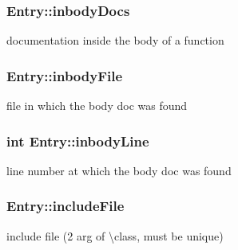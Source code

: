 \hypertarget{class_entry_a51e209dbd21d11b0c63d246efa6182f2}{}
\subsubsection[{inbody\+Docs}]{ Entry\+::inbody\+Docs}\label{class_entry_a51e209dbd21d11b0c63d246efa6182f2}


documentation inside the body of a function 

\hypertarget{class_entry_aee8cba460792393b5051230c78fbb204}{}
\subsubsection[{inbody\+File}]{ Entry\+::inbody\+File}\label{class_entry_aee8cba460792393b5051230c78fbb204}


file in which the body doc was found 

\hypertarget{class_entry_a8eed853bf654e1d583e10f04062ccdde}{}
\subsubsection[{inbody\+Line}]{\setlength{\rightskip}{0pt plus 5cm}int Entry\+::inbody\+Line}\label{class_entry_a8eed853bf654e1d583e10f04062ccdde}


line number at which the body doc was found 

\hypertarget{class_entry_a88c55fcdd65a52dce640136f18adccf2}{}
\subsubsection[{include\+File}]{ Entry\+::include\+File}\label{class_entry_a88c55fcdd65a52dce640136f18adccf2}


include file (2 arg of \textbackslash{}class, must be unique) 

\hypertarget{class_entry_a32626ce14eb253f6da64ed475419a4ac}{}
